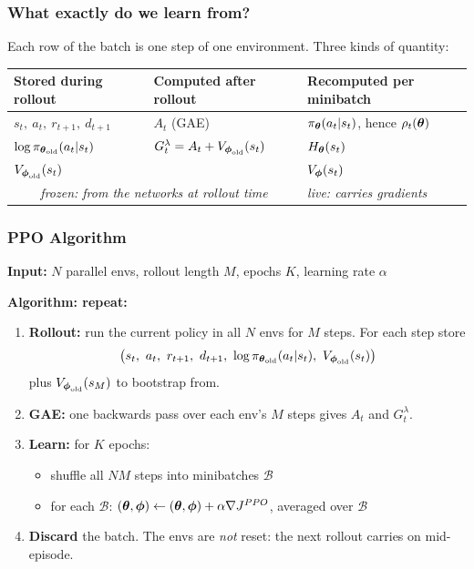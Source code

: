 \begin{frame}
    \frametitle{What exactly do we learn from?}
    Each row of the batch is one step of one environment. Three kinds of quantity:
    \vspace{0.2cm}
    \begin{center}
    \small
    \renewcommand{\arraystretch}{1.3}
    \begin{tabular}{l|l|l}
        \textbf{Stored during rollout} & \textbf{Computed after rollout} & \textbf{Recomputed per minibatch} \\ \hline
        $s_t,\ a_t,\ r_{t+1},\ d_{t+1}$ & $A_t$ (GAE) & $\pi_{\boldsymbol{\theta}}(a_t|s_t)$, hence $\rho_t({\boldsymbol{\theta}})$ \\
        $\log \pi_{{\boldsymbol{\theta}}_{\text{old}}}(a_t|s_t)$ & $G^\lambda_t = A_t + V_{{\boldsymbol{\phi}}_{\text{old}}}(s_t)$ & $H_{\boldsymbol{\theta}}(s_t)$ \\
        $V_{{\boldsymbol{\phi}}_{\text{old}}}(s_t)$ & & $V_{\boldsymbol{\phi}}(s_t)$ \\ \hline
        \multicolumn{2}{c|}{\textit{frozen: from the networks at rollout time}} & \textit{live: carries gradients}
    \end{tabular}
    \end{center}
\end{frame}

\begin{frame}
    \frametitle{PPO Algorithm}
    \textbf{Input:} $N$ parallel envs, rollout length $M$, epochs $K$, learning rate $\alpha$

    \textbf{Algorithm: repeat:}
    \begin{enumerate}
        \item \textbf{Rollout:} run the current policy in all $N$ envs for $M$ steps.
        For each step store
        $$
        \big(s_t,\ a_t,\ r_{t+1},\ d_{t+1},\ \log \pi_{\bth_\old}(a_t|s_t),\ V_{\pth_\old}(s_t)\big)
        $$
        plus $V_{{\boldsymbol{\phi}}_{\text{old}}}(s_M)$ to bootstrap from.
        \item \textbf{GAE:} one backwards pass over each env's $M$ steps gives
        $A_t$ and $G^\lambda_t$.
        \item \textbf{Learn:} for $K$ epochs:
        \begin{itemize}
            \item shuffle all $NM$ steps into minibatches $\mathcal{B}$
            \item for each $\mathcal{B}$:
            $({\boldsymbol{\theta}}, {\boldsymbol{\phi}}) \leftarrow ({\boldsymbol{\theta}}, {\boldsymbol{\phi}}) + \alpha \nabla J^{PPO}$, averaged over $\mathcal{B}$
        \end{itemize}
        \item \textbf{Discard} the batch. The envs are \textit{not} reset:
        the next rollout carries on mid-episode.
    \end{enumerate}
\end{frame}

